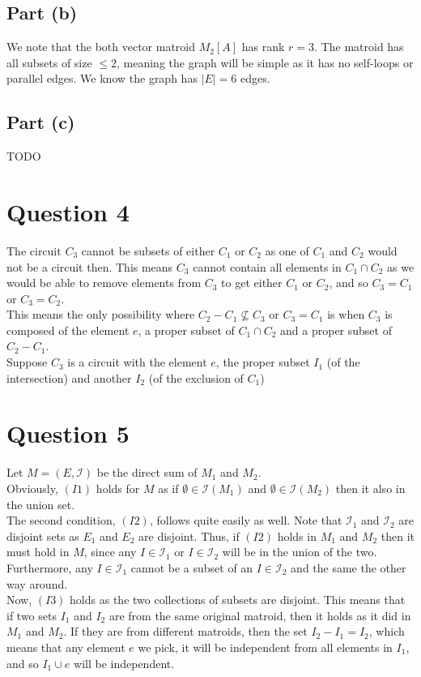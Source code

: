 \documentclass[a4paper, fleqn]{article}
\begin{document}
\subsection*{Part (b)}
We note that the both vector matroid $M_2[A]$ has rank $r=3$. The matroid has all subsets of size $\leq 2$, meaning the graph will be simple as it has no self-loops or parallel edges. We know the graph has $|E|=6$ edges.


\subsection*{Part (c)}
TODO

\section*{Question 4}
The circuit $C_3$ cannot be subsets of either $C_1$ or $C_2$ as one of $C_1$ and $C_2$ would not be a circuit then. This means $C_3$ cannot contain all elements in $C_1\cap C_2$ as we would be able to remove elements from $C_3$ to get either $C_1$ or $C_2$, and so $C_3=C_1$ or $C_3=C_2$. \\
This means the only possibility where $C_2-C_1\not\subseteq C_3$ or $C_3=C_1$ is when  $C_3$ is composed of the element $e$, a proper subset of $C_1\cap C_2$ and a proper subset of $C_2-C_1$. \\
Suppose $C_3$ is a circuit with the element $e$, the proper subset $I_1$ (of the intersection) and another $I_2$ (of the exclusion of $C_1$)

\section*{Question 5}
Let $M=(E,\mathcal{I})$ be the direct sum of $M_1$ and $M_2$. \\ 
Obviously, $(I1)$ holds for $M$ as if $\emptyset\in \mathcal{I}(M_1)$ and $\emptyset\in \mathcal{I}(M_2)$ then it also in the union set. \\
The second condition, $(I2)$, follows quite easily as well. Note that $\mathcal{I}_1$ and $\mathcal{I}_2$ are disjoint sets as $E_1$ and $E_2$ are disjoint. Thus, if $(I2)$ holds in $M_1$ and $M_2$ then it must hold in $M$, since any $I\in \mathcal{I}_1$ or $I\in \mathcal{I}_2$ will be in the union of the two. Furthermore, any $I\in \mathcal{I}_1$ cannot be a subset of an $I\in \mathcal{I}_2$ and the same the other way around. \\
Now, $(I3)$ holds as the two collections of subsets are disjoint. This means that if two sets $I_1$ and $I_2$ are from the same original matroid, then it holds as it did in $M_1$ and $M_2$. If they are from different matroids, then the set $I_2-I_1=I_2$, which means that any element $e$ we pick, it will be independent from all elements in $I_1$, and so $I_1\cup e$ will be independent.
\end{document}
